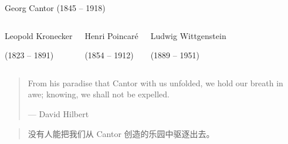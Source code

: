 \begin{frame}{}
  \begin{columns}
      \vspace{-0.20cm}
      {\centerline{\footnotesize Georg Cantor (1845 -- 1918)}}
  \end{columns}

  \begin{columns}
    \pause
      \vspace{-0.50cm}
      \begin{center}
	{\footnotesize Leopold Kronecker}
      
        {\footnotesize (1823 -- 1891)}
      \end{center}
    \pause
      \vspace{-0.50cm}
      \begin{center}
	{\footnotesize Henri Poincar\'{e}}
      
        {\footnotesize (1854 -- 1912)}
      \end{center}
    \pause
      \vspace{-0.50cm}
      \begin{center}
	{\footnotesize Ludwig Wittgenstein}
      
        {\footnotesize (1889 -- 1951)}
      \end{center}
  \end{columns}
\end{frame}

\begin{frame}{}
  \begin{quote}
    From his paradise that Cantor with us unfolded, 
    we hold our breath in awe; knowing, we shall not be expelled.

    \hfill --- David Hilbert
  \end{quote}

  \vspace{0.80cm}
  \begin{quote}
    \centerline{没有人能把我们从 Cantor 创造的乐园中驱逐出去。}
  \end{quote}

  \pause
\end{frame}

